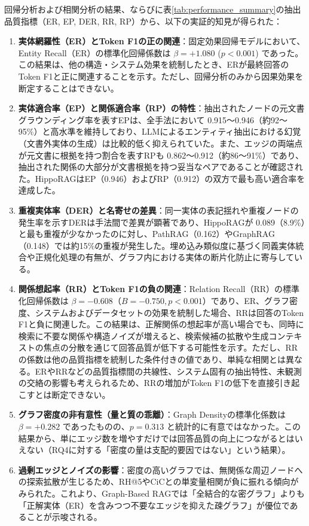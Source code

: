 \documentclass[a4j,dvipdfmx]{jsarticle}
\begin{document}
回帰分析および相関分析の結果、ならびに表\ref{tab:performance_summary}の抽出品質指標（ER, EP, DER, RR, RP）から、以下の実証的知見が得られた：
\begin{enumerate}
    \item \textbf{実体網羅性（ER）とToken F1の正の関連}：固定効果回帰モデルにおいて、Entity Recall（ER）の標準化回帰係数は $\beta = +1.080$ ($p < 0.001$) であった。この結果は、他の構造・システム効果を統制したとき、ERが最終回答のToken F1と正に関連することを示す。ただし、回帰分析のみから因果効果を断定することはできない。
    \item \textbf{実体適合率（EP）と関係適合率（RP）の特性}：抽出されたノードの元文書グラウンディング率を表すEPは、全手法において 0.915〜0.946（約92〜95\%）と高水準を維持しており、LLMによるエンティティ抽出における幻覚（文書外実体の生成）は比較的低く抑えられていた。また、エッジの両端点が元文書に根拠を持つ割合を表すRPも 0.862〜0.912（約86〜91\%）であり、抽出された関係の大部分が文書根拠を持つ妥当なペアであることが確認された。HippoRAGはEP（0.946）およびRP（0.912）の双方で最も高い適合率を達成した。
    \item \textbf{重複実体率（DER）と名寄せの差異}：同一実体の表記揺れや重複ノードの発生率を示すDERは手法間で差異が顕著であり、HippoRAGが 0.089（8.9\%）と最も重複が少なかったのに対し、PathRAG（0.162）やGraphRAG（0.148）では約15\%の重複が発生した。埋め込み類似度に基づく同義実体統合や正規化処理の有無が、グラフ内における実体の断片化防止に寄与している。
    \item \textbf{関係想起率（RR）とToken F1の負の関連}：Relation Recall（RR）の標準化回帰係数は $\beta = -0.608$（$B=-0.750, p<0.001$）であり、ER、グラフ密度、システムおよびデータセットの効果を統制した場合、RRは回答のToken F1と負に関連した。この結果は、正解関係の想起率が高い場合でも、同時に検索に不要な関係や構造ノイズが増えると、検索候補の拡散や生成コンテキストの焦点の分散を通じて回答品質が低下する可能性を示す。ただし、RRの係数は他の品質指標を統制した条件付きの値であり、単純な相関とは異なる。ERやRRなどの品質指標間の共線性、システム固有の抽出特性、未観測の交絡の影響も考えられるため、RRの増加がToken F1の低下を直接引き起こすとは断定できない。
    \item \textbf{グラフ密度の非有意性（量と質の乖離）}：Graph Densityの標準化係数は $\beta = +0.282$ であったものの、$p = 0.313$ と統計的に有意ではなかった。この結果から、単にエッジ数を増やすだけでは回答品質の向上につながるとはいえない（RQ4に対する「密度の量は支配的要因ではない」という結果）。
    \item \textbf{過剰エッジとノイズの影響}：密度の高いグラフでは、無関係な周辺ノードへの探索拡散が生じるため、RH@5やCiCとの単変量相関が負に振れる傾向がみられた。これより、Graph-Based RAGでは「全結合的な密グラフ」よりも「正解実体（ER）を含みつつ不要なエッジを抑えた疎グラフ」が優位であることが示唆される。
\end{enumerate}
\end{document}
